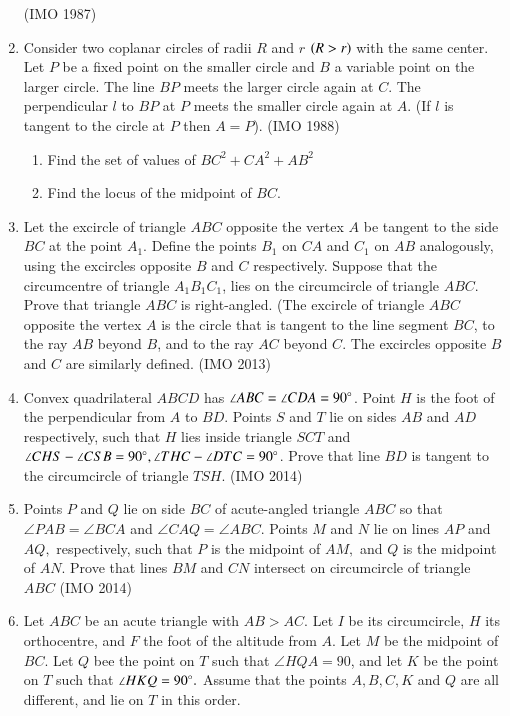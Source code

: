 \begin{enumerate}[label=\thesubsection.\arabic*,ref=\thesubsection.\theenumi]
	    \hfill(IMO  1987)
    \item Consider two coplanar circles of radii $R$ and $r$ $\left(R > r\right)$ with the same center. Let $P$ be a fixed point on the smaller circle and $B$ a variable point on the larger circle. The line $BP$ meets the larger circle again at $C$. The perpendicular $l$ to $BP $ at $P$ meets the smaller circle again at $A$. (If $l$ is tangent to the circle at $P$ then $A = P$).
\hfill(IMO  1988)
\begin{enumerate}
	\item  Find the set of values of $BC^2+CA^2+AB^2$ 
	\item  Find the locus of the midpoint of $BC$.
\end{enumerate}
\item  Let the excircle of triangle $ABC$ opposite the vertex $A$ be tangent to the side $BC$ at the point $A_1$. Define the points $B_1$ on $CA$ and $C_1$ on $AB$ analogously, using the excircles opposite $B$ and $C$ respectively. Suppose that the circumcentre of triangle $A_1B_1C_1$, lies on the circumcircle of triangle $ABC$. Prove that triangle $ABC$ is right-angled. 
	(The excircle of triangle $ABC$ opposite the vertex $A$ is the circle that is tangent to the line segment $BC$, to the ray $AB$ beyond $B$, and to the ray $AC$ beyond $C$. The excircles opposite $B$ and $C$ are similarly defined. \hfill(IMO  2013)
\item  Convex quadrilateral $ABCD$ has $\angle ABC= \angle CDA = 90 \degree$. Point $H$ is the foot of the perpendicular from $A$ to $BD$. Points $S$ and $T$ lie on sides $AB$ and $AD$ respectively, such that $H$ lies inside triangle $SCT$ and $\angle CHS- \angle CSB = 90 \degree, \angle THC- \angle DTC = 90\degree$.
	Prove that line $BD$ is tangent to the circumcircle of triangle $TSH$.
	\hfill(IMO  2014)
\item   Points $P$ and $Q$ lie on side $BC$ of acute-angled triangle $ABC$ so that $\angle PAB= \angle BCA$ and $\angle CAQ=\angle ABC.$ Points $M$ and $N$ lie on lines $AP$ and $AQ,$ respectively, such that $P$ is the midpoint of $AM,$ and $Q$ is the midpoint of $AN.$ Prove that lines $BM$ and $CN$ intersect on circumcircle of triangle $ABC$ \hfill(IMO  2014)
\item   Let $ABC$ be an acute triangle with $AB > AC$. Let $I$ be its circumcircle, $H$ its orthocentre, and $F$ the foot of the altitude from $A$. Let $M$ be the midpoint of $BC$. Let $Q$ bee the point on $T$ such that $\angle HQA= 90$, and let $K$ be the point on $T$ such that $\angle HKQ=90\degree.$ Assume that the points $ A, B, C, K$ and $Q$ are all different, and lie on $T$ in this order.

\end{enumerate}
